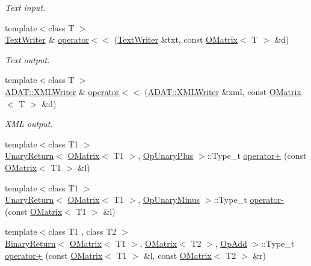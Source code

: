 \begin{DoxyCompactItemize}
\begin{DoxyCompactList}\small\item\em Text input. \end{DoxyCompactList}\item 
{\footnotesize template$<$class T $>$ }\\\mbox{\hyperlink{classENSEM_1_1TextWriter}{Text\+Writer}} \& \mbox{\hyperlink{group__obsmatrix_gacdc76da3bc2873feb9cad8323ea02e83}{operator$<$$<$}} (\mbox{\hyperlink{classENSEM_1_1TextWriter}{Text\+Writer}} \&txt, const \mbox{\hyperlink{classENSEM_1_1OMatrix}{O\+Matrix}}$<$ T $>$ \&d)
\begin{DoxyCompactList}\small\item\em Text output. \end{DoxyCompactList}\item 
{\footnotesize template$<$class T $>$ }\\\mbox{\hyperlink{classADATXML_1_1XMLWriter}{A\+D\+A\+T\+::\+X\+M\+L\+Writer}} \& \mbox{\hyperlink{group__obsmatrix_ga62a405af58665d9bce46afb03abd8c90}{operator$<$$<$}} (\mbox{\hyperlink{classADATXML_1_1XMLWriter}{A\+D\+A\+T\+::\+X\+M\+L\+Writer}} \&xml, const \mbox{\hyperlink{classENSEM_1_1OMatrix}{O\+Matrix}}$<$ T $>$ \&d)
\begin{DoxyCompactList}\small\item\em X\+ML output. \end{DoxyCompactList}\item 
{\footnotesize template$<$class T1 $>$ }\\\mbox{\hyperlink{structENSEM_1_1UnaryReturn}{Unary\+Return}}$<$ \mbox{\hyperlink{classENSEM_1_1OMatrix}{O\+Matrix}}$<$ T1 $>$, \mbox{\hyperlink{structENSEM_1_1OpUnaryPlus}{Op\+Unary\+Plus}} $>$\+::Type\+\_\+t \mbox{\hyperlink{group__obsmatrix_gae4d0316e65f7b3ddc273955cf4801ba6}{operator+}} (const \mbox{\hyperlink{classENSEM_1_1OMatrix}{O\+Matrix}}$<$ T1 $>$ \&l)
\item 
{\footnotesize template$<$class T1 $>$ }\\\mbox{\hyperlink{structENSEM_1_1UnaryReturn}{Unary\+Return}}$<$ \mbox{\hyperlink{classENSEM_1_1OMatrix}{O\+Matrix}}$<$ T1 $>$, \mbox{\hyperlink{structENSEM_1_1OpUnaryMinus}{Op\+Unary\+Minus}} $>$\+::Type\+\_\+t \mbox{\hyperlink{group__obsmatrix_gaf8abde7e3428822593f11a4317f48880}{operator-\/}} (const \mbox{\hyperlink{classENSEM_1_1OMatrix}{O\+Matrix}}$<$ T1 $>$ \&l)
\item 
{\footnotesize template$<$class T1 , class T2 $>$ }\\\mbox{\hyperlink{structENSEM_1_1BinaryReturn}{Binary\+Return}}$<$ \mbox{\hyperlink{classENSEM_1_1OMatrix}{O\+Matrix}}$<$ T1 $>$, \mbox{\hyperlink{classENSEM_1_1OMatrix}{O\+Matrix}}$<$ T2 $>$, \mbox{\hyperlink{structENSEM_1_1OpAdd}{Op\+Add}} $>$\+::Type\+\_\+t \mbox{\hyperlink{group__obsmatrix_ga0ad42a3395997cd3a2d836e981969fe2}{operator+}} (const \mbox{\hyperlink{classENSEM_1_1OMatrix}{O\+Matrix}}$<$ T1 $>$ \&l, const \mbox{\hyperlink{classENSEM_1_1OMatrix}{O\+Matrix}}$<$ T2 $>$ \&r)

\end{DoxyCompactItemize}
